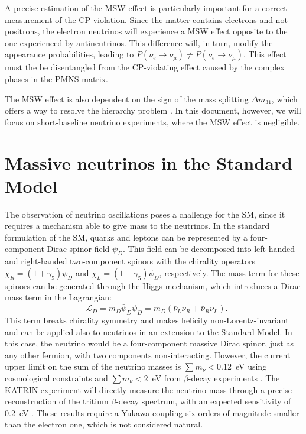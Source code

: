 A precise estimation of the MSW effect is particularly important for a correct measurement of the CP violation. Since the matter contains electrons and not positrons, the electron neutrinos will experience a MSW effect opposite to the one experienced by antineutrinos. This difference will, in turn, modify the appearance probabilities, leading to $P(\nu_{e}\rightarrow\nu_{\mu}) \neq P(\bar{\nu}_{e}\rightarrow\bar{\nu}_{\mu})$. This effect must the be disentangled from the CP-violating effect caused by the complex phases in the PMNS matrix.

The MSW effect is also dependent on the sign of the mass splitting $\Delta m_{31}$, which offers a way to resolve the hierarchy problem \cite{Smirnov:2013cqa}. 
In this document, however, we will focus on short-baseline neutrino experiments, where the MSW effect is negligible.

\section{Massive neutrinos in the Standard Model}
The observation of neutrino oscillations poses a challenge for the SM, since it requires a mechanism able to give mass to the neutrinos.
In the standard formulation of the SM, quarks and leptons can be represented by a four-component Dirac spinor field $\psi_{D}$. This field can be decomposed into left-handed and right-handed two-component spinors with the chirality operators $\chi_{R} = (1+\gamma_5)\psi_D$ and $\chi_{L} = (1-\gamma_5)\psi_D$, respectively. The mass term for these spinors can be generated through the Higgs mechanism, which introduces a Dirac mass term in the Lagrangian:
\begin{equation}
    -\mathcal{L}_D = m_D\bar{\psi}_D\psi_D = m_D(\bar{\nu}_L\nu_R + \bar{\nu}_R\nu_L).
\end{equation}
This term breaks chirality symmetry and makes helicity non-Lorentz-invariant and can be applied also to neutrinos in an extension to the Standard Model. In this case, the neutrino would be a four-component massive Dirac spinor, just as any other fermion, with two components non-interacting.
However, the current upper limit on the sum of the neutrino masses is $\sum m_{\nu} < 0.12$~eV using cosmological constraints \cite{Aghanim:2018eyx} and $\sum m_{\nu} < 2$~eV from $\beta$-decay experiments \cite{Otten:2008zz}. The KATRIN experiment will directly measure the neutrino mass through a precise reconstruction of the tritium $\beta$-decay spectrum, with an expected sensitivity of 0.2~eV \cite{Osipowicz:2001sq}. These results require a Yukawa coupling six orders of magnitude smaller than the electron one, which is not considered natural. 

